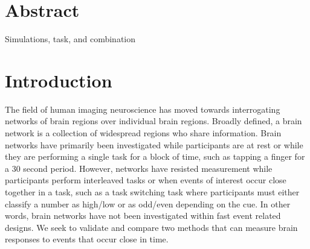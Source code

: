 \documentclass[10pt,letterpaper]{article}
\begin{document}
\section*{Abstract}
Simulations, task, and combination


\linenumbers

\section*{Introduction}

The field of human imaging neuroscience has moved towards interrogating networks of brain regions
over individual brain regions.
Broadly defined, a brain network is a collection of widespread regions who share information.
Brain networks have primarily been investigated while participants are at rest or while they are performing
a single task for a block of time, such as tapping a finger for a 30 second period.
However, networks have resisted measurement while participants perform interleaved tasks or when
events of interest occur close together in a task, such as a task switching task where participants
must either classify a number as high/low or as odd/even depending on the cue.
In other words, brain networks have not been investigated within fast event related designs.
We seek to validate and compare two methods that can measure brain responses to events that occur
close in time.
\end{document}
